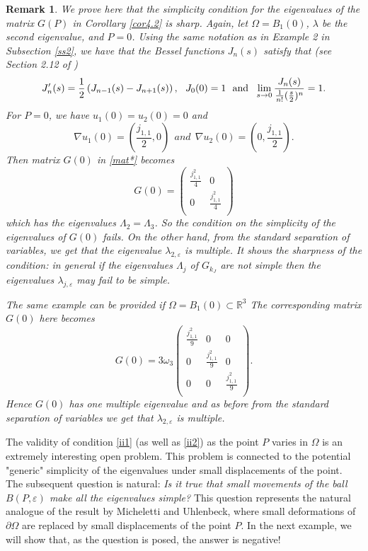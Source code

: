 \documentclass[11pt,reqno]{article}
\newtheorem{rem}[teo]{Remark}
\numberwithin{equation}{section}
\newcommand\R{\mathbb R}
\newcommand\e\varepsilon
\newcommand\la\lambda
\renewcommand\O\Omega
\begin{document}
\begin{rem}\label{ii4}
We prove here that the simplicity condition for the eigenvalues of the matrix $G(P)$ in Corollary \ref{cor4.2} is sharp. Again, let $\Omega=B_1(0)$, $\la$ be the second eigenvalue, and $P=0$. Using the same notation as in Example 2 in Subsection \ref{ss2}, we have 
that the  Bessel functions $J_n(s)$ satisfy that (see Section 2.12 of \cite{milne1945})
\begin{equation}\label{PropBess}
    J_n'(s)=\frac{1}{2}\left(J_{n-1}(s)-J_{n+1}(s)\right),\ \ J_0(0)=1 \ \ \hbox{and}\ \  \lim_{s\to0}\frac{J_n(s)}{\frac{1}{n!}(\frac{s}{2})^n}=1.
\end{equation}
For $P=0$, we have  $u_1(0)=u_2(0)=0$ and
        \begin{equation}
            \nabla u_1(0)=(\frac{j_{1,1}}{2},0)\ \ and \  \  \nabla u_2(0)=(0,\frac{j_{1,1}}{2}).
        \end{equation}
Then matrix $G(0)$ in \eqref{mat*} becomes
$$G(0)=
\begin{pmatrix}
    \frac{j_{1,1}^2}{4}&0\\
                   0&\frac{j_{1,1}^2}{4}\\
\end{pmatrix}
$$
which has the eigenvalues $\Lambda_2=\Lambda_3$. So the condition on the simplicity of the eigenvalues of $G(0)$ fails.
On the other hand, from the standard separation of variables, we get that the eigenvalue $\lambda_{2,\e}$ is multiple. It shows the sharpness of the condition: in general if the eigenvalues $\Lambda_j$ of $G_{k_J}$ are not simple then the eigenvalues $\lambda_{j,\e}$ may fail to be simple.

The same example can be provided if $\O=B_1(0)\subset\R^3$
The corresponding matrix $G(0)$ here becomes
\begin{equation}
  G(0)
                =  3\omega_3\begin{pmatrix}
					\frac{j_{1,1}^2}{9}& 0& 0\\
                   0& \frac{j_{1,1}^2}{9}& 0\\
                   0& 0& \frac{j_{1,1}^2}{9}\\
				\end{pmatrix}.
\end{equation}
Hence $G(0)$ has one multiple eigenvalue and as before from the standard separation of variables we get that $\lambda_{2,\e}$ is multiple. 
\end{rem}
The validity of condition \eqref{ii1} (as well as \eqref{ii2}) as the point $P$ varies in $\Omega$ is an extremely interesting open problem. This problem is connected to the potential "generic" simplicity of the eigenvalues under small displacements of the point. The subsequent question is natural: 
\vskip0.1cm
 {\em Is it true that small movements of the ball $B(P,\e)$ make all the eigenvalues simple?} 
\vskip0.1cm
This question represents the natural analogue of the result by Micheletti and Uhlenbeck, where small deformations of $\partial\Omega$ are replaced by small displacements of the point $P$.
In the next example, we will show that, as the question is posed, the answer is negative!
\end{document}
